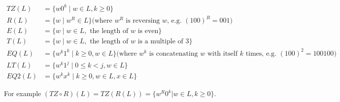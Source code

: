 \documentclass[12pt, oneside]{article}
\begin{document}
	\begin{align*}
		TZ(L) &= \{ w0^k \mid w \in L, k \geq 0 \}\\
		R(L) &= \{ w \mid w^R \in L\} \textrm{(where $w^R$ is reversing $w$, e.g. $(100)^R = 001$)}\\
		E(L) &= \{ w \mid w \in L, \textrm{ the length of $w$ is even} \} \\
		T(L) &= \{ w \mid w \in L, \textrm{ the length of $w$ is a multiple of } 3 \}\\
		EQ(L) &= \{ w^k1^k \mid k \geq 0, w \in L \} \textrm{(where $w^k$ is concatenating $w$ with itself $k$ times, e.g. $(100)^2 = 100100$)}\\
		LT(L) &= \{ w^k1^j \mid 0 \leq k < j , w \in L \}\\
		EQ2(L) &= \{ w^kx^k \mid k \geq 0, w \in L, x \in L \}
	\end{align*}

	For example $(TZ \circ R)(L) = TZ(R(L)) = \{ w^R 0^k | w \in L, k \geq 0\}$.
\end{document}
